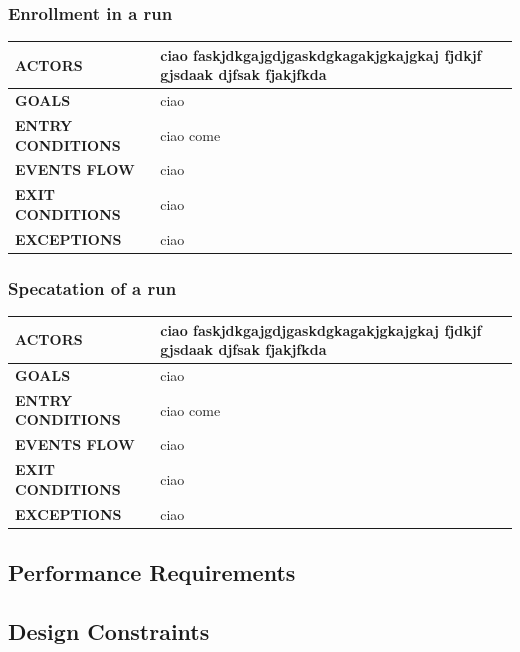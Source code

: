 \documentclass[a4paper]{article}
\begin{document}
\vspace{1cm}

\subsubsection{Enrollment in a run}
\begin{center}
    \begin{tabular}{l || p{6cm} ||}
        \bf{ACTORS} & ciao faskjdkgajgdjgaskdgkagakjgkajgkaj fjdkjf gjsdaak djfsak fjakjfkda \\ \hline
        \bf{GOALS} & ciao \\ \hline
        \bf{ENTRY CONDITIONS} & ciao come  \\ \hline
        \bf{EVENTS FLOW} & ciao\\ \hline
        \bf{EXIT CONDITIONS} & ciao\\ \hline
        \bf{EXCEPTIONS} & ciao\\ \hline \hline
    \end{tabular}
\end{center}

\vspace{1cm}

\subsubsection{Specatation of a run}
\begin{center}
    \begin{tabular}{l || p{6cm} ||}
        \bf{ACTORS} & ciao faskjdkgajgdjgaskdgkagakjgkajgkaj fjdkjf gjsdaak djfsak fjakjfkda \\ \hline
        \bf{GOALS} & ciao \\ \hline
        \bf{ENTRY CONDITIONS} & ciao come  \\ \hline
        \bf{EVENTS FLOW} & ciao\\ \hline
        \bf{EXIT CONDITIONS} & ciao\\ \hline
        \bf{EXCEPTIONS} & ciao\\ \hline \hline
    \end{tabular}
\end{center}

\subsection{Performance Requirements}

\subsection{Design Constraints}
\end{document}
